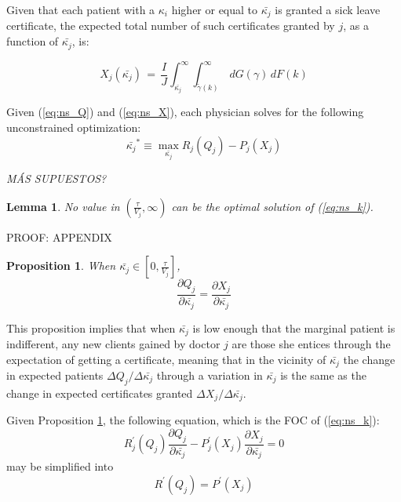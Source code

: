 \documentclass{article}
\newtheorem{lemma}[theorem]{Lemma}
\newtheorem{prop}[theorem]{Proposition}
\begin{document}
Given that each patient with a $\kappa_i$ higher or equal to $\bar{\kappa_j}$ is granted a sick leave certificate, the expected total number of such certificates granted by $j$, as a function of $\bar{\kappa_j}$, is:

\begin{equation}
    X_j(\bar{\kappa_j}) \,=\, \frac{I}{J} \int_{\bar{\kappa_j}}^{\infty} \int_{\tilde{\gamma}(k)}^{\infty} \,dG(\gamma) \,dF(k)
    \tag{N.2}\label{eq:ns_X}
\end{equation}

Given (\ref{eq:ns_Q}) and (\ref{eq:ns_X}), each physician solves for the following unconstrained optimization:
\begin{equation}
\bar{\kappa_j}^* \equiv \max_{\bar{\kappa_j}} R_j(Q_j) - P_j(X_j)
\tag{N.3}\label{eq:ns_k}
\end{equation}

\textit{MÁS SUPUESTOS?}

\begin{lemma}
\label{ns_lemma}
No value in $(\frac{\tau}{V_j},\infty)$ can be the optimal solution of (\ref{eq:ns_k}).
\end{lemma}

PROOF: APPENDIX

\begin{prop}
    \label{ns_derivatives}
When $\bar{\kappa_j} \in [0,\frac{\tau}{V_j}]$,
\[
    \frac{\partial Q_j}{\partial\bar{\kappa_j}} = \frac{\partial X_j}{\partial \bar{\kappa_j}}   
\]
\end{prop}

This proposition implies that when $\bar{\kappa_j}$ is low enough that the marginal patient is indifferent, any new clients gained by doctor $j$ are those she entices through the expectation of getting a certificate, meaning that in the vicinity of $\bar{\kappa_j}$ the change in expected patients $\Delta Q_j/\Delta\bar{\kappa_j}$ through a variation in $\bar{\kappa_j}$ is the same as the change in expected certificates granted $\Delta X_j/\Delta \bar{\kappa_j}$.

Given Proposition \ref{ns_derivatives}, the following equation, which is the FOC of (\ref{eq:ns_k}):
\[
R_j^{\prime}(Q_j)\frac{\partial Q_j}{\partial\bar{\kappa_j}}  - P_j^{\prime}(X_j)\frac{\partial X_j}{\partial \bar{\kappa_j}} = 0
\]
may be simplified into
\begin{equation}
    R^{\prime}(Q_j) = P^{\prime}(X_j)
    \tag{N.4}\label{eq:ns_FOC}
\end{equation}
\end{document}
